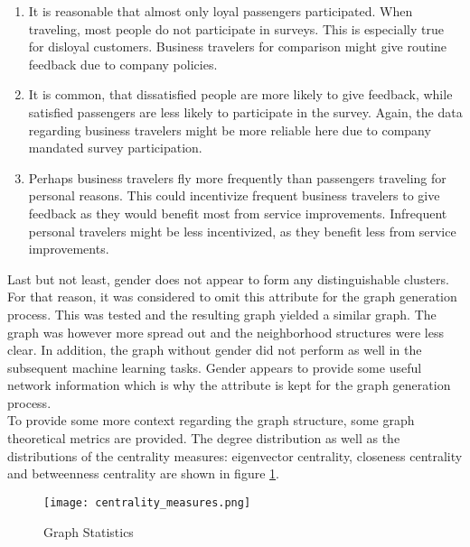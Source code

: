   \begin{enumerate}
    \item It is reasonable that almost only loyal passengers participated. When 
      traveling, most people do not participate in surveys. This is especially 
      true for disloyal customers. Business travelers for comparison might give
      routine feedback due to company policies.
    \item It is common, that dissatisfied people are more likely to give
      feedback, while satisfied passengers are less likely to participate in
      the survey. Again, the data regarding business travelers might be more
      reliable here due to company mandated survey participation.
    \item Perhaps business travelers fly more frequently than passengers
      traveling for personal reasons. This could incentivize frequent business
      travelers to give feedback as they would benefit most from service
      improvements. Infrequent personal travelers might be less incentivized,
      as they benefit less from service improvements. 
  \end{enumerate}

  \noindent Last but not least, gender does not appear to form any distinguishable 
  clusters. For that reason, it was considered to omit this attribute for the 
  graph generation process. This was tested and the resulting graph yielded 
  a similar graph. The graph was however more spread out and the neighborhood 
  structures were less clear. In addition, the graph without gender did not 
  perform as well in the subsequent machine learning tasks. Gender appears to
  provide some useful network information which is why the attribute is kept
  for the graph generation process. \\

  \noindent To provide some more context regarding the graph structure, some
  graph theoretical metrics are provided. The degree distribution as well as 
  the distributions of the centrality measures: eigenvector centrality, 
  closeness centrality and betweenness centrality are shown in 
  figure \ref{fig:centrality_measures}.

  \begin{figure}[h]
	  \centering
	  \texttt{[image: centrality\_measures.png]}
	  \caption{Graph Statistics}
      \label{fig:centrality_measures}
  \end{figure}

